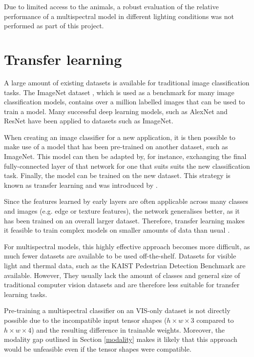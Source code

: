 \documentclass{l4proj}
\begin{document}
Due to limited access to the animals, a robust evaluation of the relative performance of a multispectral model in different lighting conditions was not performed as part of this project.


\section{Transfer learning}
\label{transfer_learning_analysis}

A large amount of existing datasets is available for traditional image classification tasks. The ImageNet dataset \citep{deng_imagenet_2009}, which is used as a benchmark for many image classification models, contains over a million labelled images that can be used to train a model. Many successful deep learning models, such as AlexNet \citep{krizhevsky_imagenet_2012} and ResNet \citep{he_deep_2016} have been applied to datasets such as ImageNet.

When creating an image classifier for a new application, it is then possible to make use of a model that has been pre-trained on another dataset, such as ImageNet. This model can then be adapted by, for instance, exchanging the final fully-connected layer of that network for one that suits suits the new classification task. Finally, the model can be trained on the new dataset. This strategy is known as transfer learning and was introduced by \citet{thrun_is_1996}.

Since the features learned by early layers are often applicable across many classes and images (e.g. edge or texture features), the network generalises better, as it has been trained on an overall larger dataset. Therefore, transfer learning makes it feasible to train complex models on smaller amounts of data than usual \citep{kwasniewska_deep_2017}.

For multispectral models, this highly effective approach becomes more difficult, as much fewer datasets are available to be used off-the-shelf. Datasets for visible light and thermal data, such as the KAIST Pedestrian Detection Benchmark \citep{hwang_multispectral_2015} are available. However, They usually lack the amount of classes and general size of traditional computer vision datasets and are therefore less suitable for transfer learning tasks.

Pre-training a multispectral classifier on an VIS-only dataset is not directly possible due to the incompatible input tensor shapes ($h \times w \times 3$ compared to $h \times w \times 4$) and the resulting difference in trainable weights. Moreover, the modality gap outlined in Section \ref{modality} makes it likely that this approach would be unfeasible even if the tensor shapes were compatible.
\end{document}
